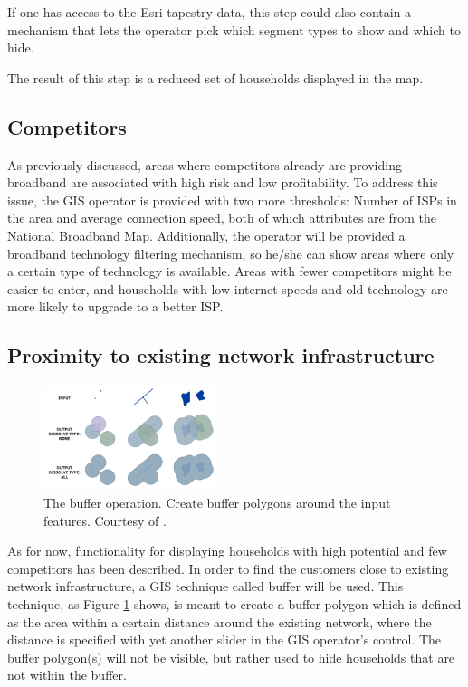 \documentclass[twocolumn]{article}
\begin{document}
If one has access to the Esri tapestry data, this step could also contain a mechanism that lets the operator pick which segment types to show and which to hide.

The result of this step is a reduced set of households displayed in the map.

\subsection{Competitors}
\label{sub:Competitors}
As previously discussed, areas where competitors already are providing broadband are associated with high risk and low profitability. To address this issue, the GIS operator is provided with two more thresholds: Number of ISPs in the area and average connection speed, both of which attributes are from the National Broadband Map. Additionally, the operator will be provided a broadband technology filtering mechanism, so he/she can show areas where only a certain type of technology is available. Areas with fewer competitors might be easier to enter, and households with low internet speeds and old technology are more likely to upgrade to a better ISP.

\subsection{Proximity to existing network infrastructure}
\label{sub:Proximity to existing network infrastructure}
\begin{figure}
  \centering
  \includegraphics[width=0.45\textwidth]{img/buffer.png}
  \caption{The buffer operation. Create buffer polygons around the input features. Courtesy of \cite{noauthor_undated-ar}.}
  \label{fig:buffer}
\end{figure}
As for now, functionality for displaying households with high potential and few competitors has been described. In order to find the customers close to existing network infrastructure, a GIS technique called buffer will be used. This technique, as Figure \ref{fig:buffer} shows, is meant to create a buffer polygon which is defined as the area within a certain distance around the existing network, where the distance is specified with yet another slider in the GIS operator's control. The buffer polygon(s) will not be visible, but rather used to hide households that are not within the buffer.
\end{document}
